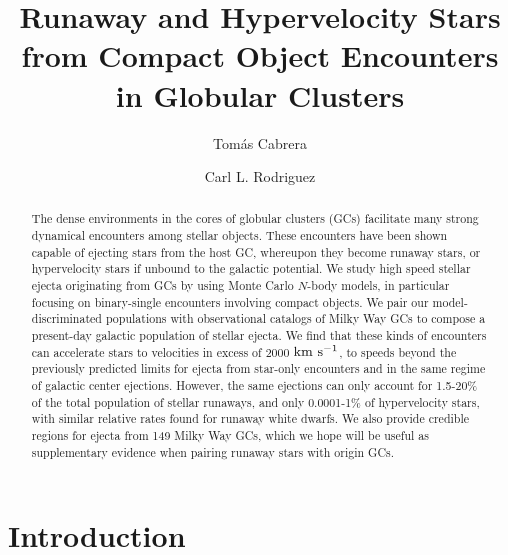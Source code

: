 \documentclass[twocolumn]{aastex631}
\newcommand{\kms}{${\rm km~s^{-1}}$}
\begin{document}
\title{Runaway and Hypervelocity Stars from Compact Object Encounters in Globular Clusters}

\author[0000-0002-1270-7666]{Tom\'as Cabrera}

\author[0000-0003-4175-8881]{Carl L. Rodriguez}

\begin{abstract}
    The dense environments in the cores of globular clusters (GCs) facilitate many strong dynamical encounters among stellar objects.
    These encounters have been shown capable of ejecting stars from the host GC, whereupon they become runaway stars, or hypervelocity stars if unbound to the galactic potential.
 	We study high speed stellar ejecta originating from GCs by using Monte Carlo $N$-body models, in particular focusing on binary-single encounters involving compact objects.
 	We pair our model-discriminated populations with observational catalogs of Milky Way GCs to compose a present-day galactic population of stellar ejecta.
 	We find that these kinds of encounters can accelerate stars to velocities in excess of 2000 \kms, to speeds beyond the previously predicted limits for ejecta from star-only encounters and in the same regime of galactic center ejections.
	However, the same ejections can only account for 1.5-20\% of the total population of stellar runaways, and only 0.0001-1\% of hypervelocity stars, with similar relative rates found for runaway white dwarfs.
	We also provide credible regions for ejecta from 149 Milky Way GCs, which we hope will be useful as supplementary evidence when pairing runaway stars with origin GCs.
\end{abstract}

\section{Introduction}
\label{sec:intro}
\end{document}
